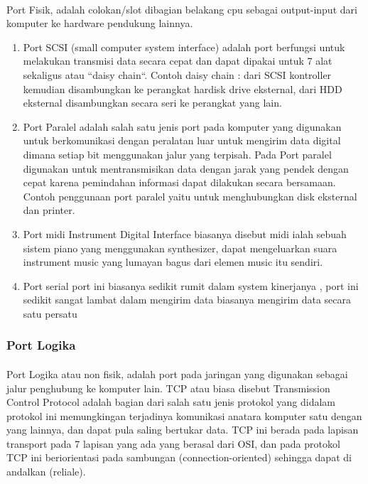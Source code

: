 \documentclass[12pt,a4paper]{article}
\begin{document}
\paragraph{}
\hspace{1cm}
Port Fisik, adalah colokan/slot dibagian belakang cpu sebagai output-input dari komputer ke hardware pendukung lainnya. \\
\begin{enumerate}
\item Port SCSI (small computer system interface) adalah port berfungsi untuk melakukan transmisi data secara cepat dan dapat dipakai untuk 7 alat sekaligus atau “daisy chain“. Contoh daisy chain : dari SCSI kontroller kemudian disambungkan ke perangkat hardisk drive eksternal, dari HDD eksternal disambungkan secara seri ke perangkat yang lain.
\item Port Paralel adalah  salah satu jenis port pada komputer yang digunakan untuk berkomunikasi dengan peralatan luar untuk mengirim data digital dimana setiap bit menggunakan jalur yang terpisah. Pada Port paralel digunakan untuk mentransmisikan data dengan jarak yang pendek dengan cepat karena pemindahan informasi dapat dilakukan secara bersamaan. Contoh penggunaan port paralel yaitu untuk menghubungkan disk eksternal dan printer.
\item Port midi Instrument Digital Interface biasanya disebut midi ialah sebuah sistem piano yang menggunakan synthesizer, dapat mengeluarkan suara instrument music yang lumayan bagus dari elemen music itu sendiri.
\item Port serial port ini biasanya sedikit rumit dalam system kinerjanya , port ini sedikit sangat lambat dalam mengirim data biasanya mengirim data secara satu persatu 
\end{enumerate}
\subsubsection {Port Logika}

\paragraph{}
\hspace{1cm} 
Port Logika atau non fisik, adalah port pada jaringan yang digunakan sebagai jalur penghubung ke komputer lain. TCP atau biasa disebut Transmission Control Protocol adalah bagian dari salah satu jenis protokol yang didalam protokol ini memungkingan terjadinya komunikasi anatara komputer satu dengan yang lainnya, dan dapat pula saling bertukar data. TCP ini berada pada lapisan transport pada 7 lapisan yang ada yang berasal dari OSI, dan pada protokol TCP ini beriorientasi pada sambungan (connection-oriented) sehingga dapat di andalkan (reliale).
\end{document}
